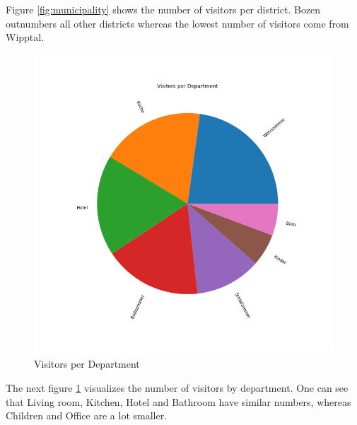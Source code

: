 \documentclass[letterpaper,12pt]{article}
\begin{document}
Figure \ref{fig:municipality} shows the number of visitors per district. Bozen outnumbers all other districts whereas the lowest number of visitors come from Wipptal.

\begin{figure}[H] 
        \centering
        \includegraphics[width=\columnwidth]{../images/department.png}
        \caption{
                \label{fig:department}  
                Visitors per Department
        }
\end{figure}

The next figure \ref{fig:department} visualizes the number of visitors by department. One can see that Living room, Kitchen, Hotel and Bathroom have similar numbers, whereas Children and Office are a lot smaller.
\end{document}
